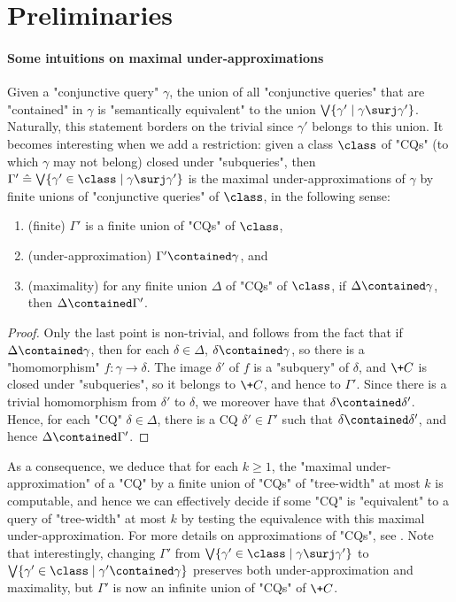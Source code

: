 \section{\AP{}Preliminaries}
\label{sec:prelim}

\paragraph*{Some intuitions on maximal under-approximations}
Given a "conjunctive query" $\gamma$,
the union of all "conjunctive queries"
that are "contained" in $\gamma$ is "semantically equivalent" to the union
$\bigvee \{ \gamma' \mid \gamma \surj \gamma' \}$. Naturally, this statement borders on the trivial since $\gamma'$ belongs to this union. It becomes interesting when we add a restriction:
given a class $\class$ of "CQs" (to which $\gamma$ may not belong) closed under "subqueries", then $\Gamma' \defeq \bigvee \{ \gamma' \in \class \mid \gamma \surj \gamma' \}$ is the maximal under-approximations
of $\gamma$ by finite unions of "conjunctive queries" of $\class$, in the following sense:
\begin{enumerate}[label=\roman*.]
	\item (finite) $\Gamma'$ is a finite union of "CQs" of $\class$,
	\item (under-approximation) $\Gamma' \contained \gamma$, and
	\item (maximality) for any finite union $\Delta$ of "CQs" of $\class$, if $\Delta \contained \gamma$, then $\Delta \contained \Gamma'$.
\end{enumerate}

\begin{proof}
Only the last point is non-trivial, and follows from the fact that if
$\Delta \contained \gamma$, then for each $\delta \in \Delta$, $\delta \contained \gamma$,
so there is a "homomorphism" $f\colon \gamma \to \delta$. The image $\delta'$
of $f$ is a "subquery" of $\delta$, and $\+C$ is closed under "subqueries",
so it belongs to $\+C$, and hence to $\Gamma'$. Since there is a trivial homomorphism
from $\delta'$ to $\delta$, we moreover have that $\delta \contained \delta'$.
Hence, for each "CQ" $\delta \in \Delta$, there is a CQ $\delta' \in \Gamma'$ such
that $\delta \contained \delta'$, and hence $\Delta \contained \Gamma'$.
\end{proof}

As a consequence, we deduce that for each $k \geq 1$,
the "maximal under-approximation" of a "CQ" by
a finite union of "CQs" of "tree-width" at most $k$ is computable, and hence
we can effectively decide if some "CQ" is "equivalent" to a query of "tree-width" at
most $k$ by testing the equivalence with this maximal under-approximation.
For more details on approximations of "CQs", see \cite{BarceloLibkinRomero2014Efficient}.
Note that interestingly, changing $\Gamma'$ from
$\bigvee \{ \gamma' \in \class \mid \gamma \surj \gamma' \}$
to $\bigvee \{ \gamma' \in \class \mid \gamma' \contained \gamma \}$
preserves both under-approximation and maximality, but $\Gamma'$ is now an infinite
union of "CQs" of $\+C$.

